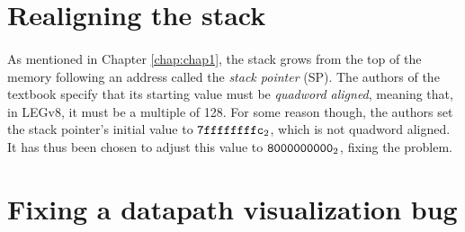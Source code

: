 \section{Realigning the stack}
\paragraph{}
As mentioned in Chapter \ref{chap:chap1}, the stack grows from the top of the memory following an address called the \emph{stack pointer} (SP). The authors of the textbook \cite{patterson2016computer} specify that its starting value must be \emph{quadword aligned}, meaning that, in LEGv8, it must be a multiple of 128. For some reason though, the authors set the stack pointer's initial value to $\verb|7ffffffffc|_2$, which is not quadword aligned. It has thus been chosen to adjust this value to $\verb|8000000000|_2$, fixing the problem.
\section{Fixing a datapath visualization bug}

